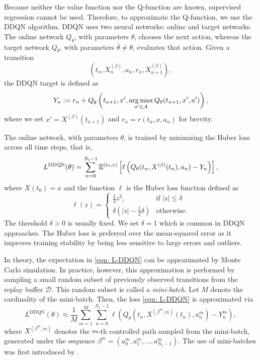 Because neither the value function nor the Q-function are known, supervised regression cannot be used. Therefore, to approximate the Q-function, we use the DDQN algorithm. DDQN uses two neural networks: online and target networks. The online network $Q_\theta$, with parameters $\theta$, chooses the next action, whereas the target network $Q_{\bar{\theta}}$, with parameters $\bar \theta \neq \theta$, evaluates that action. Given a transition 
\begin{equation*}
    (t_n,X^{(\beta)}_n,a_n,r_n,X^{(\beta)}_{n+1}),
\end{equation*}
the DDQN target is defined as
\begin{equation}
    Y_n := r_n + Q_{\bar \theta}\left( t_{n+1}, x', \operatorname*{arg\,max}_{a' \in \mathcal A} Q_\theta(t_{n+1},x',a') \right),
    \label{eqn: DDQN target}
\end{equation}
where we set $x' = X^{(\beta)}(t_{n+1})$ and $r_n = r(t_n,x,a_n)$ for brevity.

The online network, with parameters $\theta$, is trained by minimising the Huber loss across all time steps, that is,
\begin{equation}
    L^{\text{DDQN}}(\theta) = \sum_{n=0}^{N_t-1} \mathbb{E}^{(t_0,x)} \left[ \ell\left( Q_\theta(t_n,X^{(\beta)}(t_n),a_n) - Y_n \right) \right],
    \label{eqn: L-DDQN}
\end{equation}
where $X(t_0) = x$ and the function $\ell$ is the Huber loss function defined as
\begin{equation*}
    \ell (z) =
    \begin{cases}
        \frac{1}{2} z^2, & \text{if } |z|\leq \delta \\[1ex]
        \delta \left(|z| - \frac{1}{2}\delta \right) & \text{otherwise}.
    \end{cases}
\end{equation*}
The threshold $\delta > 0$ is usually fixed. We set $\delta = 1$ which is common in DDQN approaches. The Huber loss is preferred over the mean‑squared error as it improves training stability by being less sensitive to large errors and outliers.

In theory, the expectation in \eqref{eqn: L-DDQN} can be approximated by Monte Carlo simulation. In practice, however, this approximation is performed by sampling a small random subset of previously observed transitions from the replay buffer $\mathcal{D}$. This random subset is called a \emph{mini-batch}. Let $M$ denote the cardinality of the mini-batch. Then, the loss \eqref{eqn: L-DDQN} is approximated via
\begin{equation}
    L^{\text{DDQN}}(\theta) \approx \frac{1}{M}\sum_{m=1}^{M}\sum_{n=0}^{N_t-1} \ell \left( Q_\theta(t_n,X^{(\beta^{m},m)}(t_n),a^{m}_n) - Y_n^m \right),
    \label{eqn: L-DDQN minibatches}
\end{equation}
where $X^{(\beta^m,m)}$ denotes the $m$-th controlled path sampled from the mini-batch, generated under the sequence $\beta^m = (a_0^m, a_1^m, \ldots, a_{N_t-1}^m)$. The use of mini-batches was first introduced by \textcite{mnih2015human}.

